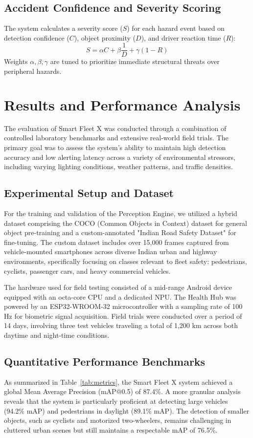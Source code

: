 \documentclass[conference]{IEEEtran}
\begin{document}
\subsection{Accident Confidence and Severity Scoring}
The system calculates a severity score (\(S\)) for each hazard event based on detection confidence (\(C\)), object proximity (\(D\)), and driver reaction time (\(R\)):
\[
S = \alpha C + \beta \frac{1}{D} + \gamma (1 - R)
\]
Weights \(\alpha, \beta, \gamma\) are tuned to prioritize immediate structural threats over peripheral hazards.

\section{Results and Performance Analysis}

The evaluation of Smart Fleet X was conducted through a combination of controlled laboratory benchmarks and extensive real-world field trials. The primary goal was to assess the system's ability to maintain high detection accuracy and low alerting latency across a variety of environmental stressors, including varying lighting conditions, weather patterns, and traffic densities.

\subsection{Experimental Setup and Dataset}
For the training and validation of the Perception Engine, we utilized a hybrid dataset comprising the COCO (Common Objects in Context) dataset for general object pre-training and a custom-annotated "Indian Road Safety Dataset" for fine-tuning. The custom dataset includes over 15,000 frames captured from vehicle-mounted smartphones across diverse Indian urban and highway environments, specifically focusing on classes relevant to fleet safety: pedestrians, cyclists, passenger cars, and heavy commercial vehicles.

The hardware used for field testing consisted of a mid-range Android device equipped with an octa-core CPU and a dedicated NPU. The Health Hub was powered by an ESP32-WROOM-32 microcontroller with a sampling rate of 100 Hz for biometric signal acquisition. Field trials were conducted over a period of 14 days, involving three test vehicles traveling a total of 1,200 km across both daytime and night-time conditions.

\subsection{Quantitative Performance Benchmarks}
As summarized in Table~\ref{tab:metrics}, the Smart Fleet X system achieved a global Mean Average Precision (mAP@0.5) of 87.4\%. A more granular analysis reveals that the system is particularly proficient at detecting large vehicles (94.2\% mAP) and pedestrians in daylight (89.1\% mAP). The detection of smaller objects, such as cyclists and motorized two-wheelers, remains challenging in cluttered urban scenes but still maintains a respectable mAP of 76.5\%.
\end{document}
